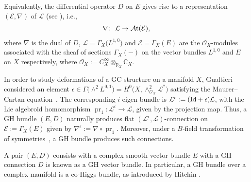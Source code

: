 \documentclass[pdftex]{sigma}
\numberwithin{equation}{section}
\theoremstyle{definition}
\begin{document}
Equivalently, the differential operator $D$ on $E$
gives rise to a representation $(\mathcal{E}, \nabla)$ of $\mathcal{L}$ (see \cite{BRT, BP}), i.e.,
\[
\nabla\colon \ \mathcal{L} \rightarrow \mathcal{A}{\rm t}(\mathcal{E}),
\]
where $\nabla$ is the dual of ${D}$, $\mathcal{L}=\Gamma_{X}\bigl(L^{1, 0}\bigr)$ and $\mathcal{E}=\Gamma_X(E)$ are the $\mathcal{O}_X$-modules associated with the sheaf of sections $\Gamma_X(-)$ on the vector bundles $L^{1, 0}$ and $E$ on $X$ respectively, where $\mathcal{O}_X:= C^{\infty}_X \otimes_{\mathbb{R}_X} \mathbb{C}_X$.

In order to study deformations of a GC structure on a manifold $X$, Gualtieri considered an element $\epsilon \in \Gamma\bigl(\wedge^2 L^{0,1}\bigr)= H^0\bigl(X, \wedge^2_{\mathcal{O}_X}\mathcal{L}^*\bigr)$ satisfying the Maurer--Cartan equation~\cite{MG-GC}. The corresponding $i$-eigen bundle is $\mathcal{L}^{\epsilon}:=({\rm Id}+ \epsilon) \mathcal{L}$, with the Lie algebroid homomorphism ${\operatorname{pr}_1\colon \mathcal{L}^{\epsilon} \rightarrow \mathcal{L}}$, given by the projection map. Thus, a GH bundle $(E, D)$ naturally produces flat $(\mathcal{L}^{\epsilon}, \mathcal{L})$\nobreakdash-con\-nec\-tion on $\mathcal{E}:=\Gamma_X(E)$ given by $\nabla^{\epsilon}:=\nabla \circ \operatorname{pr}_1$.
Moreover, under a $B$-field transformation
of symmetries~\cite{MG-GC}, a GH bundle produces such connections.

A pair $(E, D)$ consists with a complex smooth vector bundle $E$ with a GH connection $D$ is known as a GH vector bundle. In particular, a GH bundle over a complex manifold is a co-Higgs bundle, as introduced by Hitchin \cite{NH}.
\end{document}
